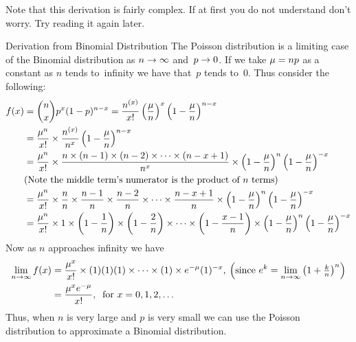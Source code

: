 \begin{info}
Note that this derivation is fairly complex. If at first you do not understand don't worry. Try reading it again later.
\end{info}
\begin{theory}{Derivation from Binomial Distribution}
The Poisson distribution is a limiting case of the Binomial distribution as $n \rightarrow \infty$ and~$p \rightarrow 0$. If we take $\mu = np$ as a constant as $n$ tends to~infinity we have that~$p$ tends to~0. Thus consider the following:
\begin{align*}
    f(x) &= \binom{n}{x} p^x (1-p)^{n-x} 
          = \frac{n^{(x)}}{x!} \left(\frac{\mu}{n}\right)^x \left(1-\frac{\mu}{n}\right)^{n-x} \\
         &= \frac{\mu^n}{x!} \times \frac{n^{(x)}}{n^x} \left(1-\frac{\mu}{n}\right)^{n-x} \\
         &= \frac{\mu^n}{x!} \times \frac{n \times (n-1) \times (n-2) \times \cdots \times (n-x+1)}{n^x} \times \left(1-\frac{\mu}{n}\right)^{n}\left(1-\frac{\mu}{n}\right)^{-x} \\
         &\text{(Note the middle term's numerator is the product of $n$ terms)} \\
         &= \frac{\mu^n}{x!} \times \frac{n}{n} \times \frac{n-1}{n} \times \frac{n-2}{n} \times \cdots \times \frac{n-x+1}{n} \times \left(1-\frac{\mu}{n}\right)^{n}\left(1-\frac{\mu}{n}\right)^{-x} \\
         &= \frac{\mu^n}{x!} \times 1 \times \left(1-\frac{1}{n}\right) \times \left(1-\frac{2}{n}\right) \times \cdots \times \left(1-\frac{x-1}{n}\right) \times \left(1-\frac{\mu}{n}\right)^{n}\left(1-\frac{\mu}{n}\right)^{-x} \\
\end{align*}
Now as $n$ approaches infinity we have
\begin{align*}
    \lim_{n \rightarrow \infty} f(x) 
    &= \frac{\mu^x}{x!}\times (1)(1)(1)\times\cdots\times(1) \times e^{-\mu} (1)^{-x}
    ,\:\left(\text{since } e^k = \lim_{n \rightarrow \infty}\left(1 + \textstyle\frac{k}{n}\right)^n\right) \\
    &= \frac{\mu^x e^{-\mu}}{x!},\:\text{ for } x = 0,1,2,\ldots
\end{align*}
Thus, when $n$ is very large and $p$ is very small we can use the Poisson distribution to approximate a Binomial distribution.
\end{theory}
